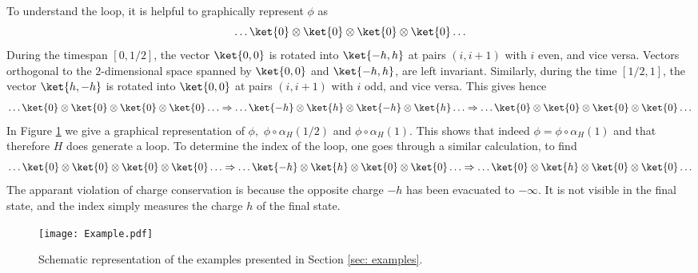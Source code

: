 To understand the loop, it is helpful to graphically represent $ \phi$ as 
$$
\ldots \ket{0} \otimes \ket{0}\otimes \ket{0} \otimes \ket{0}  \ldots 
$$
During the timespan $ [0,1/2]$, the vector $\ket{0,0}$ is rotated into $\ket{-h,h}$ at pairs $(i,i+1)$ with $i$ even, and vice versa. Vectors orthogonal to the $2$-dimensional space spanned by $\ket{0,0}$ and $\ket{-h,h}$, are left invariant. 
Similarly, during the time $ [1/2,1]$, the vector  $\ket{h,-h}$ is rotated into $\ket{0,0}$ at pairs $(i,i+1)$ with $i$ odd, and vice versa.
This gives hence
$$
\ldots \ket{0} \otimes \ket{0}\otimes \ket{0} \otimes \ket{0} \ldots  \Rightarrow   \ldots \ket{-h} \otimes \ket{h}\otimes \ket{-h} \otimes \ket{h} 
\ldots  \Rightarrow \ldots
\ket{0} \otimes \ket{0}\otimes \ket{0} \otimes \ket{0} \ldots
$$
In Figure \ref{fig:ExampleLoop} we give a graphical representation of $\phi,$ $\phi\circ\alpha_H(1/2)$ and $\phi\circ\alpha_H(1)$. This shows that indeed $\phi=\phi\circ\alpha_H(1)$ and that therefore $H$ does generate a loop. To determine the index of the loop, one goes through a similar calculation, to find
$$
\ldots \ket{0} \otimes \ket{0}\otimes \ket{0} \otimes \ket{0} \ldots \Rightarrow \ldots \ket{-h} \otimes \ket{h}\otimes \ket{0} \otimes \ket{0} 
\ldots \Rightarrow \ldots
\ket{0} \otimes \ket{h}\otimes \ket{0} \otimes \ket{0} \ldots 
$$
The apparant violation of charge conservation is because the opposite charge $-h$ has been evacuated to $-\infty$. It is not visible in the final state, and the index simply measures the charge $h$ of the final state.

\begin{figure}[ht] 
	\begin{center}
		\texttt{[image: Example.pdf]}
		\caption{Schematic representation of the examples presented in Section \ref{sec: examples}.}
		\label{fig:ExampleLoop}
	\end{center}
\end{figure}

